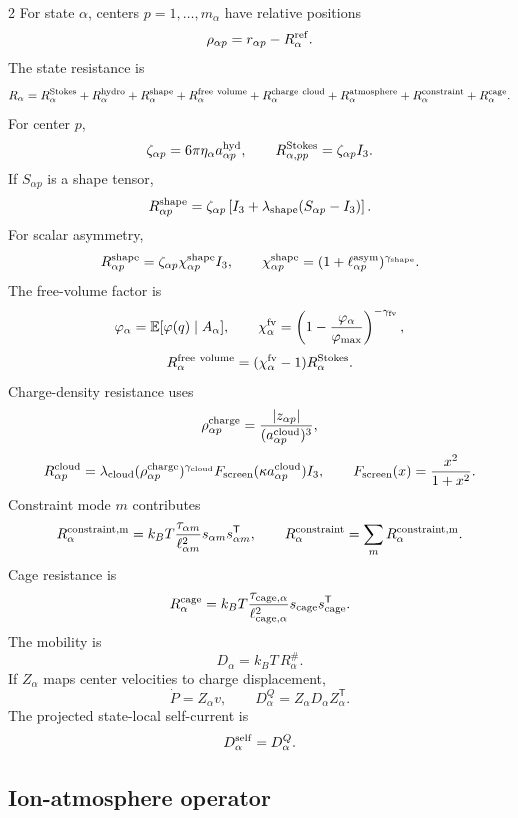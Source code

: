 \documentclass[10pt]{article}
\newcommand{\T}{\mathsf{T}}
\begin{document}
\begin{multicols}{2}
For state \(\alpha\), centers \(p=1,\ldots,m_\alpha\) have relative positions
\[
\rho_{\alpha p}=r_{\alpha p}-R_\alpha^{\rm ref}.
\]
The state resistance is
\[
R_\alpha=
R_\alpha^{\rm Stokes}
+R_\alpha^{\rm hydro}
+R_\alpha^{\rm shape}
+R_\alpha^{\rm free\ volume}
+R_\alpha^{\rm charge\ cloud}
+R_\alpha^{\rm atmosphere}
+R_\alpha^{\rm constraint}
+R_\alpha^{\rm cage}.
\]
For center \(p\),
\[
\zeta_{\alpha p}=6\pi\eta_\alpha a_{\alpha p}^{\rm hyd},
\qquad
R_{\alpha,pp}^{\rm Stokes}=\zeta_{\alpha p}I_3.
\]
If \(S_{\alpha p}\) is a shape tensor,
\[
R_{\alpha p}^{\rm shape}
=
\zeta_{\alpha p}\left[I_3+\lambda_{\rm shape}(S_{\alpha p}-I_3)\right].
\]
For scalar asymmetry,
\[
R_{\alpha p}^{\rm shape}
=
\zeta_{\alpha p}\chi_{\alpha p}^{\rm shape}I_3,
\qquad
\chi_{\alpha p}^{\rm shape}
=
(1+\ell_{\alpha p}^{\rm asym})^{\gamma_{\rm shape}}.
\]
The free-volume factor is
\[
\varphi_\alpha=\mathbb E[\varphi(q)\mid A_\alpha],
\qquad
\chi_\alpha^{\rm fv}
=
\left(1-\frac{\varphi_\alpha}{\varphi_{\max}}\right)^{-\gamma_{\rm fv}},
\]
\[
R_\alpha^{\rm free\ volume}
=
(\chi_\alpha^{\rm fv}-1)R_\alpha^{\rm Stokes}.
\]
Charge-density resistance uses
\[
\rho_{\alpha p}^{\rm charge}
=
\frac{|z_{\alpha p}|}{(a_{\alpha p}^{\rm cloud})^3},
\]
\[
R_{\alpha p}^{\rm cloud}
=
\lambda_{\rm cloud}
(\rho_{\alpha p}^{\rm charge})^{\gamma_{\rm cloud}}
F_{\rm screen}(\kappa a_{\alpha p}^{\rm cloud})I_3,
\qquad
F_{\rm screen}(x)=\frac{x^2}{1+x^2}.
\]
Constraint mode \(m\) contributes
\[
R_{\alpha}^{\rm constraint,m}
=
k_BT
\frac{\tau_{\alpha m}}{\ell_{\alpha m}^2}
s_{\alpha m}s_{\alpha m}^\T,
\qquad
R_\alpha^{\rm constraint}=\sum_mR_\alpha^{\rm constraint,m}.
\]
Cage resistance is
\[
R_\alpha^{\rm cage}
=
k_BT
\frac{\tau_{{\rm cage},\alpha}}{\ell_{{\rm cage},\alpha}^2}
s_{\rm cage}s_{\rm cage}^\T.
\]
The mobility is
\[
D_\alpha=k_BT\,R_\alpha^\#.
\]
If \(Z_\alpha\) maps center velocities to charge displacement,
\[
\dot P=Z_\alpha v,
\qquad
D_\alpha^Q=Z_\alpha D_\alpha Z_\alpha^\T.
\]
The projected state-local self-current is
\[
D_\alpha^{\rm self}=D_\alpha^Q.
\]

\subsection{Ion-atmosphere operator}


\end{multicols}
\end{document}
